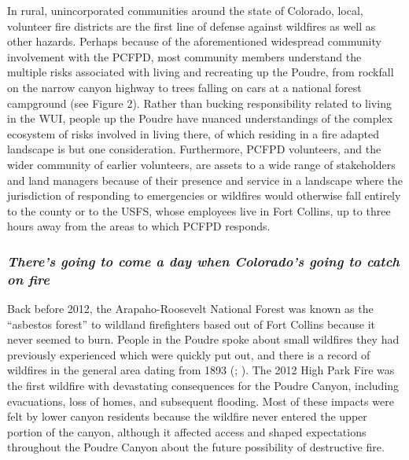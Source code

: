 \documentclass[
]{article}
\begin{document}
In rural, unincorporated communities around the state of Colorado, local, volunteer fire districts are the first line of defense against wildfires as well as other hazards. Perhaps because of the aforementioned widespread community involvement with the PCFPD, most community members understand the multiple risks associated with living and recreating up the Poudre, from rockfall on the narrow canyon highway to trees falling on cars at a national forest campground (see Figure 2). Rather than bucking responsibility related to living in the WUI, people up the Poudre have nuanced understandings of the complex ecosystem of risks involved in living there, of which residing in a fire adapted landscape is but one consideration. Furthermore, PCFPD volunteers, and the wider community of earlier volunteers, are assets to a wide range of stakeholders and land managers because of their presence and service in a landscape where the jurisdiction of responding to emergencies or wildfires would otherwise fall entirely to the county or to the USFS, whose employees live in Fort Collins, up to three hours away from the areas to which PCFPD responds.

\subsubsection{\texorpdfstring{\emph{There's going to come a day when Colorado's going to catch on fire}}{There's going to come a day when Colorado's going to catch on fire}}\label{theres-going-to-come-a-day-when-colorados-going-to-catch-on-fire}

Back before 2012, the Arapaho-Roosevelt National Forest was known as the ``asbestos forest'' to wildland firefighters based out of Fort Collins because it never seemed to burn. People in the Poudre spoke about small wildfires they had previously experienced which were quickly put out, and there is a record of wildfires in the general area dating from 1893 (; ). The 2012 High Park Fire was the first wildfire with devastating consequences for the Poudre Canyon, including evacuations, loss of homes, and subsequent flooding. Most of these impacts were felt by lower canyon residents because the wildfire never entered the upper portion of the canyon, although it affected access and shaped expectations throughout the Poudre Canyon about the future possibility of destructive fire.
\end{document}
